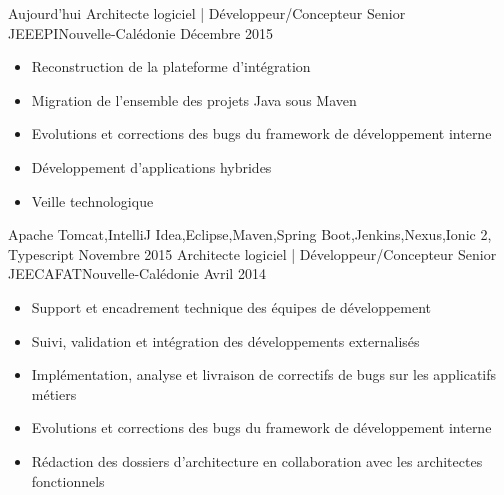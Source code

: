 %
%
%

\begin{experiences}
  \experience
    {Aujourd'hui}   {Architecte logiciel | Développeur/Concepteur Senior JEE}{EPI}{Nouvelle-Calédonie}
    {Décembre 2015} {
                      \begin{itemize}
                        \item Reconstruction de la plateforme d'intégration                        
                        \item Migration de l'ensemble des projets Java sous Maven                    
                        \item Evolutions et corrections des bugs du framework de développement interne  
                        \item Développement d'applications hybrides              
                        \item Veille technologique                                                                    
                      \end{itemize}
                    }
                    {Apache Tomcat,IntelliJ Idea,Eclipse,Maven,Spring Boot,Jenkins,Nexus,Ionic 2, Typescript}
  \emptySeparator
  \experience
    {Novembre 2015} {Architecte logiciel | Développeur/Concepteur Senior JEE}{CAFAT}{Nouvelle-Calédonie}
    {Avril 2014}    {
                      \begin{itemize}
                        \item Support et encadrement technique des équipes de développement                           
                        \item Suivi, validation et intégration des développements externalisés                        
                        \item Implémentation, analyse et livraison de correctifs de bugs sur les applicatifs métiers  
                        \item Evolutions et corrections des bugs du framework de développement interne                
                        \item Rédaction des dossiers d'architecture en collaboration avec les architectes fonctionnels

\end{itemize}}
\end{experiences}
